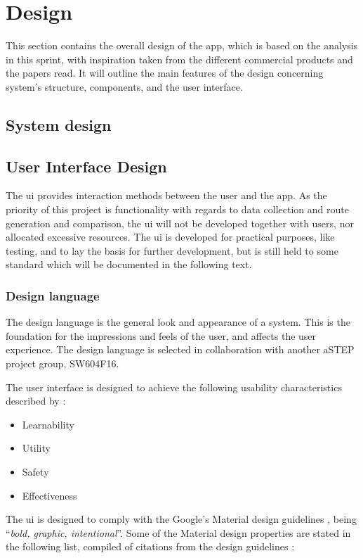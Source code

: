 \section{Design}\label{sprint1design}
This section contains the overall design of the app, which is based on the analysis in this sprint, with inspiration taken from the different commercial products and the papers read.
It will outline the main features of the design concerning system's structure, components, and the user interface.

\subsection{System design}


\subsection{User Interface Design}
The \gls{ui} provides interaction methods between the user and the app.
As the priority of this project is functionality with regards to data collection and route generation and comparison, the \gls{ui} will not be developed together with users, nor allocated excessive resources. 
The \gls{ui} is developed for practical purposes, like testing, and to lay the basis for further development, but is still held to some standard which will be documented in the following text. 

\subsubsection{Design language}
The design language is the general look and appearance of a system.
This is the foundation for the impressions and feels of the user, and affects the user experience.
The design language is selected in collaboration with another aSTEP project group, SW604F16.

The user interface is designed to achieve the following usability characteristics described by \citet{DIS2014}:
\begin{itemize}
	\item Learnability
	\item Utility
	\item Safety
	\item Effectiveness
\end{itemize}

The \gls{ui} is designed to comply with the Google's Material design guidelines \cite{materialDesign}, being ``\textit{bold, graphic, intentional}''. 
Some of the Material design properties are stated in the following list, compiled of citations from the design guidelines \cite{materialProperties}:

